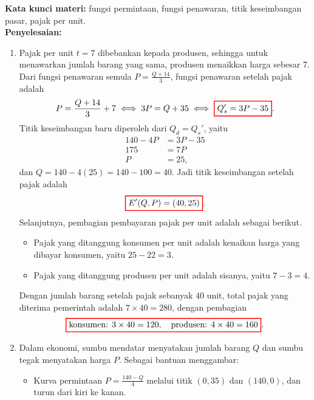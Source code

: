 \documentclass[10pt,openany,a4paper]{article}
\theoremstyle{definition}
\theoremstyle{definition}
\theoremstyle{plain}
\newenvironment{jawab}[2][tes]{%
\par\noindent\textbf{Kata kunci materi:} #1.\\
\textbf{Penyelesaian:} #2%
}{}
\begin{document}
\begin{enumerate}
\begin{jawab}[fungsi permintaan, fungsi penawaran, titik keseimbangan pasar, pajak per unit]
{\begin{enumerate}
            \item Pajak per unit $t=7$ dibebankan kepada produsen, sehingga untuk menawarkan jumlah barang yang sama, produsen menaikkan harga sebesar $7$. Dari fungsi penawaran semula $P=\frac{Q+14}{3}$, fungsi penawaran setelah pajak adalah
            \begin{align*}
                P = \frac{Q+14}{3} + 7 \iff 3P = Q + 35 \iff \colorlet{oldcolor}{.}
        \color{red}
        \setlength{\fboxrule}{1pt} \boxed{\color{oldcolor}Q_s' = 3P - 35}\color{oldcolor}.
            \end{align*}
            Titik keseimbangan baru diperoleh dari $Q_d=Q_s'$, yaitu
            \begin{align*}
                140 - 4P &= 3P - 35\\
                175 &= 7P\\
                P &= 25,
            \end{align*}
            dan $Q = 140 - 4(25) = 140 - 100 = 40$. Jadi titik keseimbangan setelah pajak adalah
            \begin{align*}
                \colorlet{oldcolor}{.}
        \color{red}
        \setlength{\fboxrule}{1pt} \boxed{\color{oldcolor}E'(Q,P)=(40,25)}\color{oldcolor}.
            \end{align*}
            Selanjutnya, pembagian pembayaran pajak per unit adalah sebagai berikut.
            \begin{itemize}
                \item Pajak yang ditanggung konsumen per unit adalah kenaikan harga yang dibayar konsumen, yaitu $25-22=3$.
                \item Pajak yang ditanggung produsen per unit adalah sisanya, yaitu $7-3=4$.
            \end{itemize}
            Dengan jumlah barang setelah pajak sebanyak $40$ unit, total pajak yang diterima pemerintah adalah $7\times 40=280$, dengan pembagian
            \[
            \colorlet{oldcolor}{.}
        \color{red}
        \setlength{\fboxrule}{1pt} \boxed{\color{oldcolor}\text{konsumen: } 3\times 40 = 120, \quad \text{produsen: } 4\times 40 = 160}\color{oldcolor}.
            \]
            \item Dalam ekonomi, sumbu mendatar menyatakan jumlah barang $Q$ dan sumbu tegak menyatakan harga $P$. Sebagai bantuan menggambar:
            \begin{itemize}
                \item Kurva permintaan $P=\frac{140-Q}{4}$ melalui titik $(0,35)$ dan $(140,0)$, dan turun dari kiri ke kanan.

\end{itemize}
\end{enumerate}}
\end{jawab}
\end{enumerate}
\end{document}
